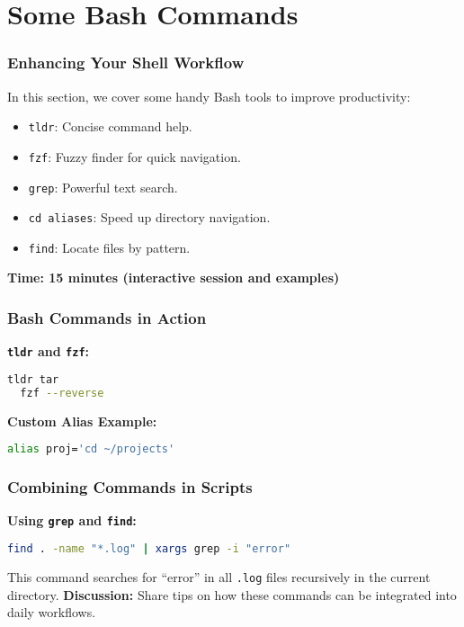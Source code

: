 \documentclass{beamer}
\begin{document}
\section{Some Bash Commands}
\begin{frame}
	\frametitle{Enhancing Your Shell Workflow}
	In this section, we cover some handy Bash tools to improve productivity:
	\begin{itemize}
		\item \texttt{tldr}: Concise command help.
		\item \texttt{fzf}: Fuzzy finder for quick navigation.
		\item \texttt{grep}: Powerful text search.
		\item \texttt{cd aliases}: Speed up directory navigation.
		\item \texttt{find}: Locate files by pattern.
	\end{itemize}
	\vfill
	\textbf{Time: 15 minutes (interactive session and examples)}
\end{frame}

\begin{frame}[fragile]
	\frametitle{Bash Commands in Action}
	\textbf{\texttt{tldr} and \texttt{fzf}:}
	\begin{lstlisting}[language=bash]
  tldr tar
  fzf --reverse
  \end{lstlisting}
	\medskip
	\textbf{Custom Alias Example:}
	\begin{lstlisting}[language=bash]
  alias proj='cd ~/projects'
  \end{lstlisting}
	\vfill
\end{frame}

\begin{frame}[fragile]
	\frametitle{Combining Commands in Scripts}
	\textbf{Using \texttt{grep} and \texttt{find}:}
	\begin{lstlisting}[language=bash]
  find . -name "*.log" | xargs grep -i "error"
  \end{lstlisting}
	This command searches for “error” in all \texttt{.log} files recursively in the current directory.
	\vfill
	\pause
	\textbf{Discussion:} Share tips on how these commands can be integrated into daily workflows.
\end{frame}

\end{document}
